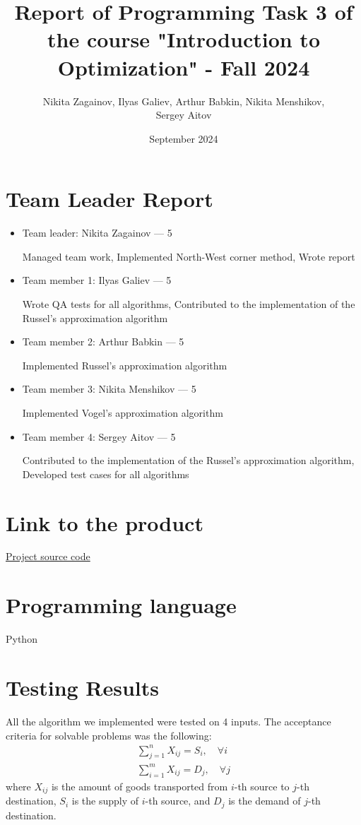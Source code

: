 \documentclass{article}
\title{Report of Programming Task 3 of the course "Introduction to Optimization" - Fall 2024}
\author{Nikita Zagainov, Ilyas Galiev, Arthur Babkin, Nikita Menshikov, \\ Sergey Aitov}
\date{September 2024}
\begin{document}
\maketitle

\section{Team Leader Report}
\noindent
\begin{itemize}
    \item Team leader: Nikita Zagainov --- 5

          Managed team work, Implemented North-West corner method, Wrote report

    \item Team member 1: Ilyas Galiev --- 5

          Wrote QA tests for all algorithms, Contributed to the implementation of the
          Russel's approximation algorithm

    \item Team member 2: Arthur Babkin --- 5

          Implemented Russel's approximation algorithm

    \item Team member 3: Nikita Menshikov --- 5

          Implemented Vogel's approximation algorithm

    \item Team member 4: Sergey Aitov --- 5

          Contributed to the implementation of the Russel's approximation algorithm,
          Developed test cases for all algorithms
\end{itemize}
\section{Link to the product}
\href{https://github.com/V1adych/transportation}{Project source code}

\section{Programming language}
Python

\section{Testing Results}
All the algorithm we implemented were tested on 4 inputs. The acceptance
criteria for solvable problems was the following:
\begin{align*}
    \sum_{j=1}^{n} X_{ij} = S_i, \quad \forall i \\
    \sum_{i=1}^{m} X_{ij} = D_j, \quad \forall j
\end{align*}
where $X_{ij}$ is the amount of goods transported from $i$-th source to $j$-th destination,
$S_i$ is the supply of $i$-th source, and $D_j$ is the demand of $j$-th destination.
\end{document}
